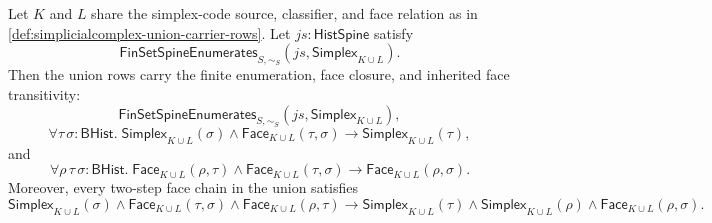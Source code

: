 \begin{theorem}
\label{thm:simplicialcomplex-union-carrier-face-closed}
Let $K$ and $L$ share the simplex-code source, classifier, and face relation as in \autoref{def:simplicialcomplex-union-carrier-rows}. Let $js:\mathsf{HistSpine}$ satisfy
$$
\mathsf{FinSetSpineEnumerates}_{S,\sim_S}(js,\mathsf{Simplex}_{K\cup L}).
$$
Then the union rows carry the finite enumeration, face closure, and inherited face transitivity:
$$
\mathsf{FinSetSpineEnumerates}_{S,\sim_S}(js,\mathsf{Simplex}_{K\cup L}),
$$
$$
\forall \tau\,\sigma:\mathsf{BHist}.\;
\mathsf{Simplex}_{K\cup L}(\sigma)\land
\mathsf{Face}_{K\cup L}(\tau,\sigma)
\to
\mathsf{Simplex}_{K\cup L}(\tau),
$$
and
$$
\forall \rho\,\tau\,\sigma:\mathsf{BHist}.\;
\mathsf{Face}_{K\cup L}(\rho,\tau)\land
\mathsf{Face}_{K\cup L}(\tau,\sigma)
\to
\mathsf{Face}_{K\cup L}(\rho,\sigma).
$$
Moreover, every two-step face chain in the union satisfies
$$
\mathsf{Simplex}_{K\cup L}(\sigma)
\land
\mathsf{Face}_{K\cup L}(\tau,\sigma)
\land
\mathsf{Face}_{K\cup L}(\rho,\tau)
\to
\mathsf{Simplex}_{K\cup L}(\tau)
\land
\mathsf{Simplex}_{K\cup L}(\rho)
\land
\mathsf{Face}_{K\cup L}(\rho,\sigma).
$$
\end{theorem}
